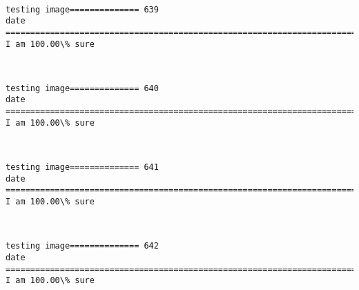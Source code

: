 \documentclass[11pt]{article}
\begin{document}
    \begin{center}
    \end{center}
    { \hspace*{\fill} \\}
    
    \begin{Verbatim}[commandchars=\\\{\}]
testing image============== 639
date
============================================================================
I am 100.00\% sure

    \end{Verbatim}

    \begin{center}
    \end{center}
    { \hspace*{\fill} \\}
    
    \begin{Verbatim}[commandchars=\\\{\}]
testing image============== 640
date
============================================================================
I am 100.00\% sure

    \end{Verbatim}

    \begin{center}
    \end{center}
    { \hspace*{\fill} \\}
    
    \begin{Verbatim}[commandchars=\\\{\}]
testing image============== 641
date
============================================================================
I am 100.00\% sure

    \end{Verbatim}

    \begin{center}
    \end{center}
    { \hspace*{\fill} \\}
    
    \begin{Verbatim}[commandchars=\\\{\}]
testing image============== 642
date
============================================================================
I am 100.00\% sure

    \end{Verbatim}
\end{document}
